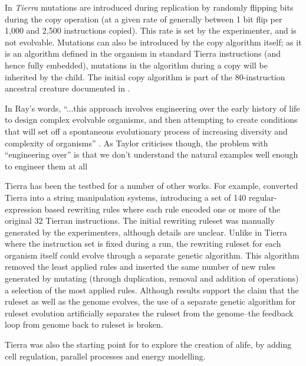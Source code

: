 In \emph{Tierra} \parencite{Ray1991} mutations are introduced during replication by randomly flipping bits during the copy operation (at a given rate of generally between 1 bit flip per 1,000 and 2,500 instructions copied). This rate is set by the experimenter, and is not evolvable. Mutations can also be introduced by the copy algorithm itself; as it is an algorithm defined in the organism in standard Tierra instructions (and hence fully embedded), mutations in the algorithm during a copy will be inherited by the child. The initial copy algorithm is part of the 80-instruction ancestral creature documented in \textcite[app.C]{Ray1991}.

In Ray's words, ``...this approach involves engineering over the early history of life to design complex evolvable organisms, and then attempting to create conditions that will set off a spontaneous evolutionary process of increasing diversity and complexity of organisms'' \parencite[p.3]{Ray1991}. As Taylor criticises though, the problem with ``engineering over'' is that we don't understand the natural examples well enough to engineer them at all \parencite{Taylor2001}

Tierra has been the testbed for a number of other works. For example, \textcite{SugiuraSuzukiShioseEtAl2003} converted Tierra into a string manipulation systems, introducing a set of 140 regular-expression based rewriting rules where each rule encoded one or more of the original 32 Tierran instructions. The initial rewriting ruleset was manually generated by the experimenters, although details are unclear. Unlike in Tierra where the instruction set is fixed during a run, the rewriting ruleset for each organism itself could evolve through a separate genetic algorithm. This algorithm removed the least applied rules and inserted the same number of new rules generated by mutating (through duplication, removal and addition of operations) a selection of the most applied rules. Although results support the claim that the ruleset as well as the genome evolves, the use of a separate genetic algorithm for ruleset evolution artificially separates the ruleset from the genome--the feedback loop from genome back to ruleset is broken.

Tierra was also the starting point for \textcite{Taylor2001, Taylor:1999sc} to explore the creation of \gls{alife}, by adding cell regulation, parallel processes and energy modelling.


